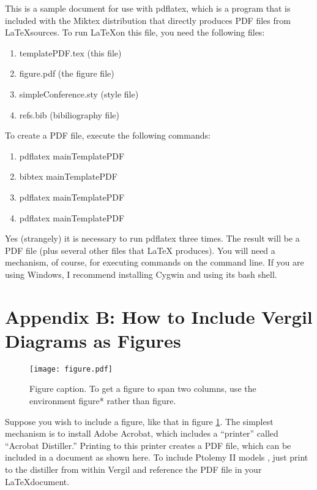 \documentclass[10pt,twocolumn]{article}
\begin{document}
This is a sample document for use with pdflatex, which is
a program that is included with the Miktex distribution
that directly produces PDF files from \LaTeX sources.
To run \LaTeX on this file, you need the following files:
\begin{enumerate}
\item templatePDF.tex (this file)
\item figure.pdf (the figure file)
\item simpleConference.sty (style file)
\item refs.bib (bibiliography file)
\end{enumerate}
\noindent
To create a PDF file, execute the following commands:
\begin{enumerate}
\item pdflatex mainTemplatePDF
\item bibtex mainTemplatePDF
\item pdflatex mainTemplatePDF
\item pdflatex mainTemplatePDF
\end{enumerate}
\noindent
Yes (strangely) it is necessary to run pdflatex three times.
The result will be a PDF file (plus several other files that \LaTeX
produces).  You will need a mechanism, of course, for executing
commands on the command line. If you are using Windows, I recommend
installing Cygwin and using its bash shell.

\section{Appendix B: How to Include Vergil Diagrams as Figures}

\begin{figure}[!b]
  \begin{center}
    \texttt{[image: figure.pdf]}
  \end{center}

  \caption{\small Figure caption. To get a figure to span two
      columns, use the environment figure* rather than figure.}
  \label{fig-label}
\end{figure}


Suppose you wish to include a figure, like that in figure \ref{fig-label}.
The simplest mechanism is to install Adobe Acrobat, which includes
a ``printer'' called ``Acrobat Distiller.'' Printing to this printer
creates a PDF file, which can be included in a document as shown
here.  To include Ptolemy II models \cite{PtolemyVol1:04}\cite{kour2014real},
just print to the distiller from within Vergil and reference
the PDF file in your \LaTeX document.
\end{document}
